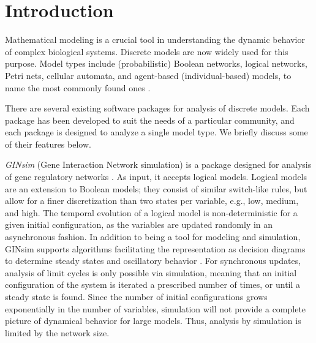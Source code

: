 \documentclass[10pt]{bmc_article}
\begin{document}
\section{Introduction}
Mathematical modeling is a crucial tool in understanding the dynamic behavior of complex
biological systems. Discrete models are now widely used for this purpose.  Model types include
(probabilistic) Boolean networks, logical networks, Petri nets, cellular
automata, and agent-based (individual-based) models, to name the most commonly found ones \cite{Steggles, heiner-petri, shmulevich, Chaouiya, cell-automata, springer_book}.

There are several existing software packages for analysis of discrete models. Each package has been developed to suit the needs of a particular community, and each package is designed to analyze a single model type. We briefly discuss some of their features below.


{\it GINsim} (Gene Interaction Network simulation) is a package designed for analysis of gene regulatory networks \cite{GINsim}. As input, it accepts logical models. Logical models are an extension to Boolean models; they consist of similar switch-like rules, but allow for a finer discretization than two states per variable, e.g., low, medium, and high. The temporal evolution of a logical model is non-deterministic for a given initial configuration, as the variables are updated randomly in an asynchronous fashion. In addition to being a tool for modeling and simulation, GINsim supports algorithms facilitating the representation as decision diagrams to determine steady states and oscillatory behavior \cite{Chaouiya}. For synchronous updates, analysis of limit cycles is only possible via simulation, meaning that an
initial configuration of the system is iterated a prescribed number of times, or until a
steady state is found. Since the number of initial configurations grows exponentially in the number of variables, simulation
will not provide a complete picture of dynamical behavior for large models. Thus, analysis by simulation is limited by the network size.   
\end{document}
